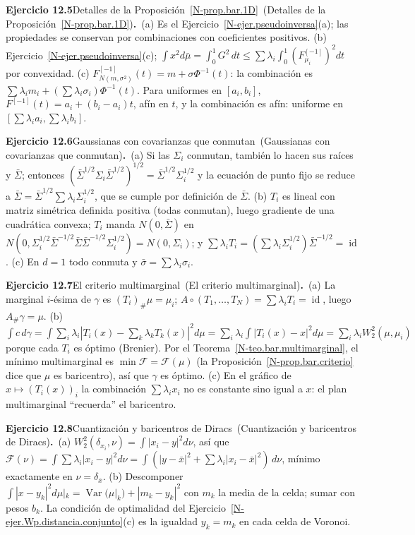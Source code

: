 \documentclass[11pt,a4paper]{amsart}
\newcommand{\id}{\operatorname{id}}
\theoremstyle{remark}
\theoremstyle{definition}
\numberwithin{subsection}{section}
\numberwithin{equation}{section}
\newcommand{\ejlabel}[2]{\par\medskip\noindent\textbf{Ejercicio #1}\ifx\relax#2\relax\else\ (#2)\fi\textbf{.}\ }
\begin{document}
\ejlabel{12.5}{Detalles de la Proposición~\ref{N-prop.bar.1D}}(a) Es el Ejercicio~\ref{N-ejer.pseudoinversa}(a); las propiedades se conservan por combinaciones con coeficientes positivos. (b) Ejercicio~\ref{N-ejer.pseudoinversa}(c); $\int x^2d\bar\mu=\int_0^1G^2\,dt\le\sum\lambda_i\int_0^1(F_{\mu_i}^{[-1]})^2dt$ por convexidad. (c) $F^{[-1]}_{N(m,\sigma^2)}(t)=m+\sigma\Phi^{-1}(t)$: la combinación es $\sum\lambda_im_i+(\sum\lambda_i\sigma_i)\Phi^{-1}(t)$. Para uniformes en $[a_i,b_i]$, $F^{[-1]}(t)=a_i+(b_i-a_i)t$, afín en $t$, y la combinación es afín: uniforme en $[\sum\lambda_ia_i,\sum\lambda_ib_i]$.

\ejlabel{12.6}{Gaussianas con covarianzas que conmutan}(a) Si las $\Sigma_i$ conmutan, también lo hacen sus raíces y $\bar\Sigma$; entonces $(\bar\Sigma^{1/2}\Sigma_i\bar\Sigma^{1/2})^{1/2}=\bar\Sigma^{1/2}\Sigma_i^{1/2}$ y la ecuación de punto fijo se reduce a $\bar\Sigma=\bar\Sigma^{1/2}\sum\lambda_i\Sigma_i^{1/2}$, que se cumple por definición de $\bar\Sigma$. (b) $T_i$ es lineal con matriz simétrica definida positiva (todas conmutan), luego gradiente de una cuadrática convexa; $T_i$ manda $N(0,\bar\Sigma)$ en $N(0,\Sigma_i^{1/2}\bar\Sigma^{-1/2}\bar\Sigma\bar\Sigma^{-1/2}\Sigma_i^{1/2})=N(0,\Sigma_i)$; y $\sum\lambda_iT_i=(\sum\lambda_i\Sigma_i^{1/2})\bar\Sigma^{-1/2}=\id$. (c) En $d=1$ todo conmuta y $\bar\sigma=\sum\lambda_i\sigma_i$.

\ejlabel{12.7}{El criterio multimarginal}(a) La marginal $i$-ésima de $\gamma$ es $(T_i)_\#\mu=\mu_i$; $A\circ(T_1,\dots,T_N)=\sum\lambda_iT_i=\id$, luego $A_\#\gamma=\mu$. (b) $\int c\,d\gamma=\int\sum_i\lambda_i|T_i(x)-\sum_k\lambda_kT_k(x)|^2d\mu=\sum_i\lambda_i\int|T_i(x)-x|^2d\mu=\sum_i\lambda_iW_2^2(\mu,\mu_i)$ porque cada $T_i$ es óptimo (Brenier). Por el Teorema~\ref{N-teo.bar.multimarginal}, el mínimo multimarginal es $\min\mathcal F=\mathcal F(\mu)$ (la Proposición~\ref{N-prop.bar.criterio} dice que $\mu$ es baricentro), así que $\gamma$ es óptimo. (c) En el gráfico de $x\mapsto(T_i(x))_i$ la combinación $\sum\lambda_ix_i$ no es constante sino igual a $x$: el plan multimarginal ``recuerda'' el baricentro.

\ejlabel{12.8}{Cuantización y baricentros de Diracs}(a) $W_2^2(\delta_{x_i},\nu)=\int|x_i-y|^2d\nu$, así que $\mathcal F(\nu)=\int\sum\lambda_i|x_i-y|^2d\nu=\int(|y-\bar x|^2+\sum\lambda_i|x_i-\bar x|^2)\,d\nu$, mínimo exactamente en $\nu=\delta_{\bar x}$. (b) Descomponer $\int|x-y_k|^2d\mu|_k=\operatorname{Var}(\mu|_k)+|m_k-y_k|^2$ con $m_k$ la media de la celda; sumar con pesos $b_k$. La condición de optimalidad del Ejercicio~\ref{N-ejer.Wp.distancia.conjunto}(c) es la igualdad $y_k=m_k$ en cada celda de Voronoi.
\end{document}
